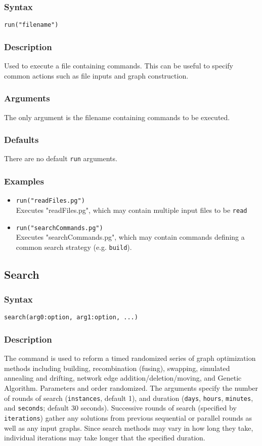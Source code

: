 \documentclass[11pt]{article}
\begin{document}
		\subsubsection{Syntax}
				\texttt{run("filename")}
		\subsubsection{Description}
			Used to execute a file containing commands.  This can be useful to specify common actions such
			as file inputs and graph construction. 
		\subsubsection{Arguments}
			The only argument is the filename containing commands to be executed.
		\subsubsection{Defaults}
			There are no default \texttt{run} arguments.  
		\subsubsection{Examples}
				\begin{itemize}
				\item{\texttt{run("readFiles.pg")}\\ Executes "readFiles.pg", which may contain multiple input files to be \texttt{read}}
				\item{\texttt{run("searchCommands.pg")}\\ Executes "searchCommands.pg", which may contain commands defining a common search strategy (e.g. \texttt{build}).}
			\end{itemize}
	
	\subsection{Search}
		\subsubsection{Syntax}
		\texttt{search(arg0:option, arg1:option, ...)}
		\subsubsection{Description}
		The command is used to reform a timed randomized series of graph optimization methods including building, 
		recombination (fusing), swapping, 
		simulated annealing and drifting, network edge addition/deletion/moving, and Genetic Algorithm.  Parameters and order
		randomized.  The arguments specify the number of rounds of search (\texttt{instances}, default 1), and duration 
		(\texttt{days}, \texttt{hours}, \texttt{minutes}, and \texttt{seconds}; default 30 seconds).  Successive rounds of search
		(specified by \texttt{iterations}) gather any solutions from previous sequential or parallel rounds as well as any input graphs.
		Since search methods may vary in how long they take, individual iterations may take longer that the specified duration.
\end{document}
